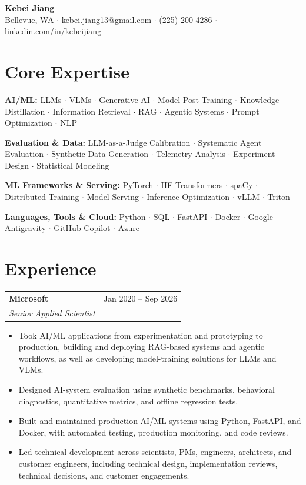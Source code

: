 \documentclass[10pt,letterpaper]{article}
\makeatletter
\newcommand{\headingwtitle}[3]{\vspace{2pt}\begin{tabularx}{\textwidth}{@{}Xr@{}}\textbf{#1} & #3\\[1pt] \textit{#2} & \end{tabularx}\vspace{-0pt}}
\makeatother
\begin{document}
\begin{center}
{\LARGE \textbf{Kebei Jiang}}\\[3pt]
Bellevue, WA \quad $\cdot$ \quad
\href{mailto:kebei.jiang13@gmail.com}{kebei.jiang13@gmail.com} \quad $\cdot$ \quad
(225) 200-4286 \quad $\cdot$ \quad
\href{https://www.linkedin.com/in/kebeijiang}{linkedin.com/in/kebeijiang}
\end{center}
\vspace{-3pt}

\section*{Core Expertise}
\textbf{AI/ML:} LLMs $\cdot$ VLMs $\cdot$ Generative AI $\cdot$ Model Post-Training $\cdot$ Knowledge Distillation $\cdot$ Information Retrieval $\cdot$ RAG $\cdot$ Agentic Systems $\cdot$ Prompt Optimization $\cdot$ NLP

\textbf{Evaluation \& Data:} LLM-as-a-Judge Calibration $\cdot$ Systematic Agent Evaluation $\cdot$ Synthetic Data Generation $\cdot$ Telemetry Analysis $\cdot$ Experiment Design $\cdot$ Statistical Modeling 

\textbf{ML Frameworks \& Serving:} PyTorch $\cdot$ HF Transformers $\cdot$ spaCy $\cdot$ Distributed Training $\cdot$ Model Serving $\cdot$ Inference Optimization $\cdot$ vLLM $\cdot$ Triton

\textbf{Languages, Tools \& Cloud:} Python $\cdot$ SQL $\cdot$ FastAPI $\cdot$ Docker $\cdot$ Google Antigravity $\cdot$ GitHub Copilot $\cdot$ Azure

\section*{Experience}
\headingwtitle{Microsoft}{Senior Applied Scientist}{Jan 2020 -- Sep 2026}
\begin{itemize}
\item Took AI/ML applications from experimentation and prototyping to production, building and deploying RAG-based systems and agentic workflows, as well as developing model-training solutions for LLMs and VLMs.
\item Designed AI-system evaluation using synthetic benchmarks, behavioral diagnostics, quantitative metrics, and offline regression tests.
\item Built and maintained production AI/ML systems using Python, FastAPI, and Docker, with automated testing, production monitoring, and code reviews.
\item Led technical development across scientists, PMs, engineers, architects, and customer engineers, including technical design, implementation reviews, technical decisions, and customer engagements.
\end{itemize}
\end{document}
